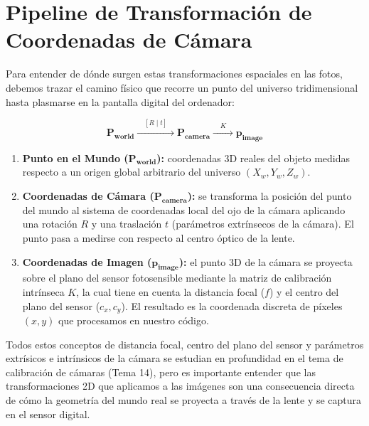 \section{Pipeline de Transformación de Coordenadas de Cámara}
Para entender de dónde surgen estas transformaciones espaciales en las fotos, debemos trazar el camino físico que recorre un punto del universo tridimensional hasta plasmarse en la pantalla digital del ordenador:

$$\mathbf{P_{world}} \xrightarrow{\quad [R \mid t] \quad} \mathbf{P_{camera}} \xrightarrow{\quad K \quad} \mathbf{p_{image}}$$

\begin{enumerate}
    \item \textbf{Punto en el Mundo ($\mathbf{P_{world}}$):} coordenadas 3D reales del objeto medidas respecto a un origen global arbitrario del universo $(X_w, Y_w, Z_w)$.
    \item \textbf{Coordenadas de Cámara ($\mathbf{P_{camera}}$):} se transforma la posición del punto del mundo al sistema de coordenadas local del ojo de la cámara aplicando una rotación $R$ y una traslación $t$ (parámetros extrínsecos de la cámara). El punto pasa a medirse con respecto al centro óptico de la lente.
    \item \textbf{Coordenadas de Imagen ($\mathbf{p_{image}}$):} el punto 3D de la cámara se proyecta sobre el plano del sensor fotosensible mediante la matriz de calibración intrínseca $K$, la cual tiene en cuenta la distancia focal ($f$) y el centro del plano del sensor ($c_x, c_y$). El resultado es la coordenada discreta de píxeles $(x, y)$ que procesamos en nuestro código.
\end{enumerate}

\noindent
Todos estos conceptos de distancia focal, centro del plano del sensor y parámetros extrísicos e intrínsicos de la cámara se estudian en profundidad en el tema de calibración de cámaras (Tema 14), pero es importante entender que las transformaciones 2D que aplicamos a las imágenes son una consecuencia directa de cómo la geometría del mundo real se proyecta a través de la lente y se captura en el sensor digital.


